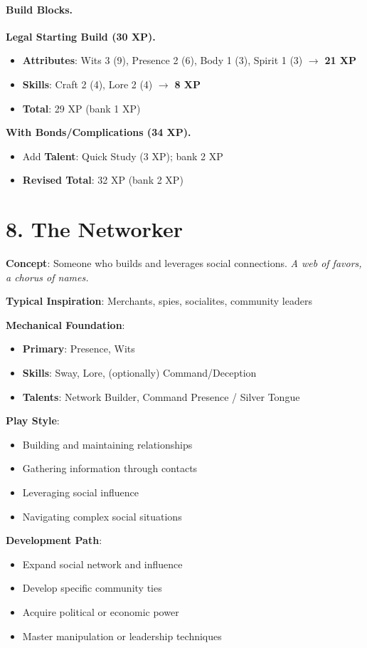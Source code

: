 \begin{multicols}{2}
\paragraph{Build Blocks.}
\textbf{Legal Starting Build (30 XP).}
\begin{itemize}
\item \textbf{Attributes}: Wits 3 (9), Presence 2 (6), Body 1 (3), Spirit 1 (3) $\rightarrow$ \textbf{21 XP}
\item \textbf{Skills}: Craft 2 (4), Lore 2 (4) $\rightarrow$ \textbf{8 XP}
\item \textbf{Total}: 29 XP (bank 1 XP)
\end{itemize}
\textbf{With Bonds/Complications (34 XP).}
\begin{itemize}
\item Add \textbf{Talent}: Quick Study (3 XP); bank 2 XP
\item \textbf{Revised Total}: 32 XP (bank 2 XP)
\end{itemize}

\section{8. The Networker}

\textbf{Concept}: Someone who builds and leverages social connections. \emph{A web of favors, a chorus of names.}

\textbf{Typical Inspiration}: Merchants, spies, socialites, community leaders

\textbf{Mechanical Foundation}:
\begin{itemize}
\item \textbf{Primary}: Presence, Wits
\item \textbf{Skills}: Sway, Lore, (optionally) Command/Deception
\item \textbf{Talents}: Network Builder, Command Presence / Silver Tongue
\end{itemize}

\textbf{Play Style}:
\begin{itemize}
\item Building and maintaining relationships
\item Gathering information through contacts
\item Leveraging social influence
\item Navigating complex social situations
\end{itemize}

\textbf{Development Path}:
\begin{itemize}
\item Expand social network and influence
\item Develop specific community ties
\item Acquire political or economic power
\item Master manipulation or leadership techniques
\end{itemize}


\end{multicols}
